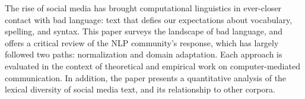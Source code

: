 The rise of social media has brought computational linguistics in ever-closer contact with bad language: text that defies our expectations about vocabulary,
 spelling, and syntax. This paper surveys the landscape of bad language, and
 offers a critical review of the NLP community's response, which has largely
 followed two paths: normalization and domain adaptation. Each approach is
 evaluated in the context of theoretical and empirical work on computer-mediated
 communication. In addition, the paper presents a quantitative analysis of the
 lexical diversity of social media text, and its relationship to other corpora.

